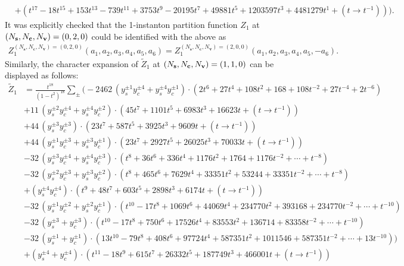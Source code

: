 \documentclass[letterpaper, 11pt]{article}
\newcommand{\nn}{\nonumber}
\begin{document}
{\begin{align}
  &+(t^{17}-18t^{15}+153t^{13}-739t^{11}+3753t^9-20195t^{7}+49881t^{5}+1203597t^{3}+4481279t^{1}+(t\rightarrow t^{-1}))\Big).\nn
\end{align}
It was explicitly checked that the 1-instanton partition function $Z_1$ at $(N_{\bf s},N_{\bf c}, N_{\bf v}) = (0,2,0)$ could be identified with the above as
\begin{align}
  {Z}_{1}^{(N_{\mathbf{s}},N_\mathbf{c},N_{\mathbf{v}}) = (0,2,0)}(a_1,a_2,a_3,a_4,a_5,a_6) = {Z}_{1}^{(N_{\mathbf{s}},N_\mathbf{c},N_{\mathbf{v}}) = (2,0,0)}(a_1,a_2,a_3,a_4,a_5,-a_6).
\end{align}
Similarly, the character expansion of $\tilde{Z}_1$ at $(N_{\bf s},N_{\bf c}, N_{\bf v}) = (1,1,0)$ can be displayed as follows:
\begin{align}
  \label{eq:so12-s1c1}
  \tilde{Z}_1&=\frac{t^{18}}{(1-t^2)^{18}}\sum_{\pm}\Big(
  -2462\,(y_s^{\pm1}y_c^{\pm4}+y_s^{\pm4}y_c^{\pm1})\cdot{(2t^6+27t^4+108t^2+168+108t^{-2}+27t^{-4}+2t^{-6})}\nn\\
  &+11\,(y_s^{\pm2}y_c^{\pm4}+y_s^{\pm4}y_c^{\pm2})\cdot{(45t^7+1101t^5+6983t^3+16623t+ (t\rightarrow t^{-1}))}\nn\\
  &+44\,(y_s^{\pm3}y_c^{\pm3})\cdot{(23t^7+587t^5+3925t^3+9609t+ (t\rightarrow t^{-1}))}\\
  &+44\,(y_s^{\pm1}y_c^{\pm3}+y_s^{\pm3}y_c^{\pm1})\cdot{(23t^7+2927t^5+26025t^3+70033t+(t\rightarrow t^{-1}))}\nn\\
  &-32\,(y_s^{\pm3}y_c^{\pm4}+y_s^{\pm4}y_c^{\pm3})\cdot{(t^8+36t^6+336t^4+1176t^2+1764+1176t^{-2}+\cdots+t^{-8})}\nn\\
  &-32\,(y_s^{\pm2}y_c^{\pm3}+y_s^{\pm3}y_c^{\pm2})\cdot{(t^8+465t^6+7629t^4+33351t^2+53244+33351t^{-2}+\cdots+t^{-8})}\nn\\
  &+(y_s^{\pm4}y_c^{\pm4})\cdot {(t^9+48t^7+603t^5+2898t^3+6174t+(t\rightarrow t^{-1}))}\nn\\
  &-32\,(y_s^{\pm1}y_c^{\pm2}+y_s^{\pm2}y_c^{\pm1})\cdot (t^{10}-17t^8+1069t^6+44069t^4+234770t^2+393168+234770t^{-2} +\cdots+t^{-10})\nn\\
  &-32\,(y_s^{\pm3}+y_c^{\pm3})\cdot{(t^{10}-17t^8+750t^6+17526t^4+83553t^2+136714+83358t^{-2}+\cdots+t^{-10})}\nn\\
  &-32\,(y_s^{\pm1}+y_c^{\pm1})\cdot (13t^{10}-79t^8+408t^6+97724t^4+587351t^2+1011546+587351t^{-2}+\cdots +13t^{-10}))\nn\\
  &+(y_s^{\pm4}+y_c^{\pm4})\cdot{(t^{11}-18t^9+615t^7+26332t^5+187749t^3+466001t+(t\rightarrow t^{-1}))}\nn\\

\end{align}}
\end{document}
